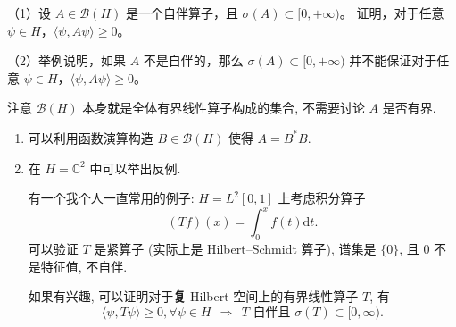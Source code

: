 \begin{2}
（1）设 $A \in \mathcal{B}(H)$ 是一个自伴算子，且 $\sigma(A) \subset[0,+\infty)$。
证明，对于任意 $\psi \in H$，$\langle\psi, A \psi\rangle \geqslant 0$。

（2）举例说明，如果 $A$ 不是自伴的，那么 $\sigma(A) \subset[0,+\infty)$ 
并不能保证对于任意 $\psi \in H$，$\langle\psi, A \psi\rangle \geqslant 0$。
\end{2}
注意 $\mathcal{B}(H)$ 本身就是全体有界线性算子构成的集合, 不需要讨论 $A$ 是否有界.
\begin{enumerate}
    \item[(1)] 可以利用函数演算构造 $B\in\mathcal{B}(H)$ 使得 $A=B^*B$. 
    \item[(2)] 在 $H=\mathbb{C}^2$ 中可以举出反例. 

    有一个我个人一直常用的例子: $H=L^2[0,1]$ 上考虑积分算子 
    $$(Tf)(x)=\int_0^xf(t)\mathrm{d}t.$$
    可以验证 $T$ 是紧算子 (实际上是 Hilbert--Schmidt 算子), 谱集是 $\{0\}$, 且 $0$ 不是特征值, 不自伴.
    
    如果有兴趣, 可以证明对于\textbf{复} Hilbert 空间上的有界线性算子 $T$, 有 
    $$\langle \psi,T\psi\rangle\geqslant 0, \forall\psi\in H
    \ \ \Longrightarrow\ \ T \text{ 自伴且 } \sigma(T)\subset[0,\infty).$$
    \end{enumerate}

